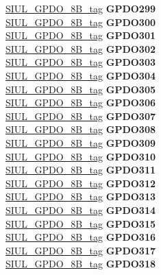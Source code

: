 \begin{DoxyCompactItemize}
\begin{tabbing}
\>\>\mbox{\hyperlink{unionSIUL__GPDO__8B__tag}{SIUL\_GPDO\_8B\_tag}} {\bfseries GPDO299}\\
\>\>\mbox{\hyperlink{unionSIUL__GPDO__8B__tag}{SIUL\_GPDO\_8B\_tag}} {\bfseries GPDO300}\\
\>\>\mbox{\hyperlink{unionSIUL__GPDO__8B__tag}{SIUL\_GPDO\_8B\_tag}} {\bfseries GPDO301}\\
\>\>\mbox{\hyperlink{unionSIUL__GPDO__8B__tag}{SIUL\_GPDO\_8B\_tag}} {\bfseries GPDO302}\\
\>\>\mbox{\hyperlink{unionSIUL__GPDO__8B__tag}{SIUL\_GPDO\_8B\_tag}} {\bfseries GPDO303}\\
\>\>\mbox{\hyperlink{unionSIUL__GPDO__8B__tag}{SIUL\_GPDO\_8B\_tag}} {\bfseries GPDO304}\\
\>\>\mbox{\hyperlink{unionSIUL__GPDO__8B__tag}{SIUL\_GPDO\_8B\_tag}} {\bfseries GPDO305}\\
\>\>\mbox{\hyperlink{unionSIUL__GPDO__8B__tag}{SIUL\_GPDO\_8B\_tag}} {\bfseries GPDO306}\\
\>\>\mbox{\hyperlink{unionSIUL__GPDO__8B__tag}{SIUL\_GPDO\_8B\_tag}} {\bfseries GPDO307}\\
\>\>\mbox{\hyperlink{unionSIUL__GPDO__8B__tag}{SIUL\_GPDO\_8B\_tag}} {\bfseries GPDO308}\\
\>\>\mbox{\hyperlink{unionSIUL__GPDO__8B__tag}{SIUL\_GPDO\_8B\_tag}} {\bfseries GPDO309}\\
\>\>\mbox{\hyperlink{unionSIUL__GPDO__8B__tag}{SIUL\_GPDO\_8B\_tag}} {\bfseries GPDO310}\\
\>\>\mbox{\hyperlink{unionSIUL__GPDO__8B__tag}{SIUL\_GPDO\_8B\_tag}} {\bfseries GPDO311}\\
\>\>\mbox{\hyperlink{unionSIUL__GPDO__8B__tag}{SIUL\_GPDO\_8B\_tag}} {\bfseries GPDO312}\\
\>\>\mbox{\hyperlink{unionSIUL__GPDO__8B__tag}{SIUL\_GPDO\_8B\_tag}} {\bfseries GPDO313}\\
\>\>\mbox{\hyperlink{unionSIUL__GPDO__8B__tag}{SIUL\_GPDO\_8B\_tag}} {\bfseries GPDO314}\\
\>\>\mbox{\hyperlink{unionSIUL__GPDO__8B__tag}{SIUL\_GPDO\_8B\_tag}} {\bfseries GPDO315}\\
\>\>\mbox{\hyperlink{unionSIUL__GPDO__8B__tag}{SIUL\_GPDO\_8B\_tag}} {\bfseries GPDO316}\\
\>\>\mbox{\hyperlink{unionSIUL__GPDO__8B__tag}{SIUL\_GPDO\_8B\_tag}} {\bfseries GPDO317}\\
\>\>\mbox{\hyperlink{unionSIUL__GPDO__8B__tag}{SIUL\_GPDO\_8B\_tag}} {\bfseries GPDO318}\\

\end{tabbing}
\end{DoxyCompactItemize}
